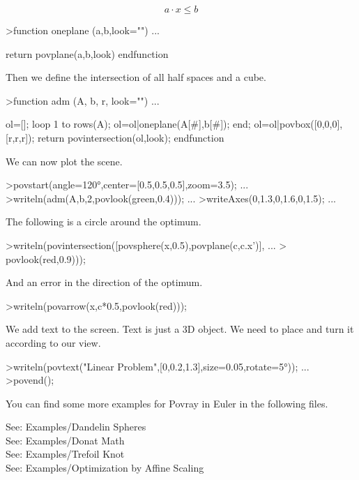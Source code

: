 \documentclass[a4paper,10pt]{article}
\begin{document}
\begin{eulernotebook}
\begin{eulercomment}
\end{eulercomment}
\begin{eulerformula}
\[
a \cdot x \le b
\]
\end{eulerformula}
\begin{eulerprompt}
>function oneplane (a,b,look="") ...
\end{eulerprompt}
\begin{eulerudf}
    return povplane(a,b,look)
  endfunction
\end{eulerudf}
\begin{eulercomment}
Then we define the intersection of all half spaces and a cube.
\end{eulercomment}
\begin{eulerprompt}
>function adm (A, b, r, look="") ...
\end{eulerprompt}
\begin{eulerudf}
    ol=[];
    loop 1 to rows(A); ol=ol|oneplane(A[#],b[#]); end;
    ol=ol|povbox([0,0,0],[r,r,r]);
    return povintersection(ol,look);
  endfunction
\end{eulerudf}
\begin{eulercomment}
We can now plot the scene.
\end{eulercomment}
\begin{eulerprompt}
>povstart(angle=120°,center=[0.5,0.5,0.5],zoom=3.5); ...
>writeln(adm(A,b,2,povlook(green,0.4))); ...
>writeAxes(0,1.3,0,1.6,0,1.5); ...
\end{eulerprompt}
\begin{eulercomment}
The following is a circle around the optimum.
\end{eulercomment}
\begin{eulerprompt}
>writeln(povintersection([povsphere(x,0.5),povplane(c,c.x')], ...
>  povlook(red,0.9)));
\end{eulerprompt}
\begin{eulercomment}
And an error in the direction of the optimum.
\end{eulercomment}
\begin{eulerprompt}
>writeln(povarrow(x,c*0.5,povlook(red)));
\end{eulerprompt}
\begin{eulercomment}
We add text to the screen. Text is just a 3D object. We need to place
and turn it according to our view.
\end{eulercomment}
\begin{eulerprompt}
>writeln(povtext("Linear Problem",[0,0.2,1.3],size=0.05,rotate=5°)); ...
>povend();
\end{eulerprompt}
\begin{eulercomment}
You can find some more examples for Povray in Euler in the following
files.

See: Examples/Dandelin Spheres\\
See: Examples/Donat Math\\
See: Examples/Trefoil Knot\\
See: Examples/Optimization by Affine Scaling
\end{eulercomment}
\end{eulernotebook}
\end{document}
